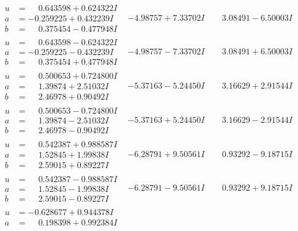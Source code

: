 \documentclass[1p]{elsarticle_modified}
\theoremstyle{definition}
\begin{document}
$$\begin{array}{c|c|c}
\begin{aligned}
u &= \phantom{-}0.643598 + 0.624322 I \\
a &= -0.259225 + 0.432239 I \\
b &= \phantom{-}0.375454 - 0.477948 I\end{aligned}
 & -4.98757 + 7.33702 I & \phantom{-}3.08491 - 6.50003 I \\ \hline\begin{aligned}
u &= \phantom{-}0.643598 - 0.624322 I \\
a &= -0.259225 - 0.432239 I \\
b &= \phantom{-}0.375454 + 0.477948 I\end{aligned}
 & -4.98757 - 7.33702 I & \phantom{-}3.08491 + 6.50003 I \\ \hline\begin{aligned}
u &= \phantom{-}0.500653 + 0.724800 I \\
a &= \phantom{-}1.39874 + 2.51032 I \\
b &= \phantom{-}2.46978 + 0.90492 I\end{aligned}
 & -5.37163 - 5.24450 I & \phantom{-}3.16629 + 2.91544 I \\ \hline\begin{aligned}
u &= \phantom{-}0.500653 - 0.724800 I \\
a &= \phantom{-}1.39874 - 2.51032 I \\
b &= \phantom{-}2.46978 - 0.90492 I\end{aligned}
 & -5.37163 + 5.24450 I & \phantom{-}3.16629 - 2.91544 I \\ \hline\begin{aligned}
u &= \phantom{-}0.542387 + 0.988587 I \\
a &= \phantom{-}1.52845 + 1.99838 I \\
b &= \phantom{-}2.59015 + 0.89227 I\end{aligned}
 & -6.28791 + 9.50561 I & \phantom{-}0.93292 - 9.18715 I \\ \hline\begin{aligned}
u &= \phantom{-}0.542387 - 0.988587 I \\
a &= \phantom{-}1.52845 - 1.99838 I \\
b &= \phantom{-}2.59015 - 0.89227 I\end{aligned}
 & -6.28791 - 9.50561 I & \phantom{-}0.93292 + 9.18715 I \\ \hline\begin{aligned}
u &= -0.628677 + 0.944378 I \\
a &= \phantom{-}0.198398 + 0.992384 I \\

\end{aligned}
\end{array}$$
\end{document}
